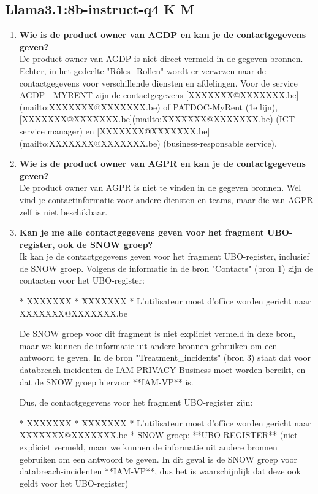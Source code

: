 \subsection{Llama3.1:8b-instruct-q4 K M}
\begin{enumerate}
    \item \textbf{Wie is de product owner van AGDP en kan je de contactgegevens geven?} \\
    De product owner van AGDP is niet direct vermeld in de gegeven bronnen. Echter, in het gedeelte "Rôles\_Rollen" wordt er verwezen naar de contactgegevens voor verschillende diensten en afdelingen. Voor de service AGDP - MYRENT zijn de contactgegevens [XXXXXXX@XXXXXXX.be](mailto:XXXXXXX@XXXXXXX.be) of PATDOC-MyRent (1e lijn), [XXXXXXX@XXXXXXX.be](mailto:XXXXXXX@XXXXXXX.be) (ICT - service manager) en [XXXXXXX@XXXXXXX.be](mailto:XXXXXXX@XXXXXXX.be) (business-responsable service).
    
    \item \textbf{Wie is de product owner van AGPR en kan je de contactgegevens geven?} \\
    De product owner van AGPR is niet te vinden in de gegeven bronnen. Wel vind je contactinformatie voor andere diensten en teams, maar die van AGPR zelf is niet beschikbaar.
 
    \item \textbf{Kan je me alle contactgegevens geven voor het fragment UBO-register, ook de SNOW groep?} \\
    Ik kan je de contactgegevens geven voor het fragment UBO-register, inclusief de SNOW groep. Volgens de informatie in de bron "Contacts" (bron 1) zijn de contacten voor het UBO-register:
    
    * XXXXXXX
    * XXXXXXX
    * L'utilisateur moet d'office worden gericht naar\\
     XXXXXXX@XXXXXXX.be
    
    De SNOW groep voor dit fragment is niet expliciet vermeld in deze bron, maar we kunnen de informatie uit andere bronnen gebruiken om een antwoord te geven. In de bron "Treatment\_incidents" (bron 3) staat dat voor databreach-incidenten de IAM PRIVACY Business moet worden bereikt, en dat de SNOW groep hiervoor **IAM-VP** is.
    
    Dus, de contactgegevens voor het fragment UBO-register zijn:
    
    * XXXXXXX
    * XXXXXXX
    * L'utilisateur moet d'office worden gericht naar\\
     XXXXXXX@XXXXXXX.be
    * SNOW groep: **UBO-REGISTER** (niet expliciet vermeld, maar we kunnen de informatie uit andere bronnen gebruiken om een antwoord te geven. In dit geval is de SNOW groep voor databreach-incidenten **IAM-VP**, dus het is waarschijnlijk dat deze ook geldt voor het UBO-register)
    

\end{enumerate}
